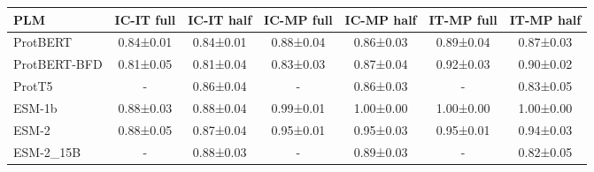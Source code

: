 \begin{tabular}{lcccccc}
\toprule
         \textbf{PLM} & \textbf{IC-IT full} & \textbf{IC-IT half} & \textbf{IC-MP full} & \textbf{IC-MP half} & \textbf{IT-MP full} & \textbf{IT-MP half} \\
\midrule
    ProtBERT &  0.84±0.01 &  0.84±0.01 &  0.88±0.04 &  0.86±0.03 &  0.89±0.04 &  0.87±0.03 \\
ProtBERT-BFD &  0.81±0.05 &  0.81±0.04 &  0.83±0.03 &  0.87±0.04 &  0.92±0.03 &  0.90±0.02 \\
      ProtT5 &          - &  0.86±0.04 &          - &  0.86±0.03 &          - &  0.83±0.05 \\
      ESM-1b &  0.88±0.03 &  0.88±0.04 &  0.99±0.01 &  1.00±0.00 &  1.00±0.00 &  1.00±0.00 \\
       ESM-2 &  0.88±0.05 &  0.87±0.04 &  0.95±0.01 &  0.95±0.03 &  0.95±0.01 &  0.94±0.03 \\
   ESM-2\_15B &          - &  0.88±0.03 &          - &  0.89±0.03 &          - &  0.82±0.05 \\
\bottomrule
\end{tabular}
